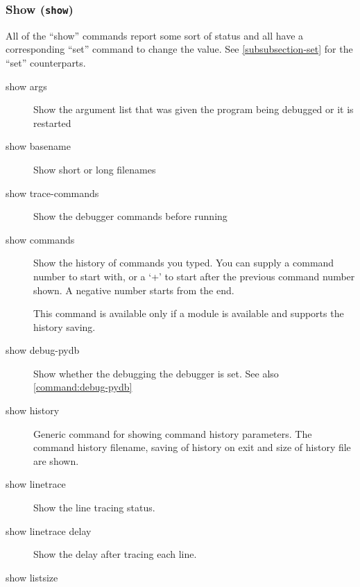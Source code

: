 \subsubsection{Show ({\tt show}) \label{subsubsection-show}}

All of the ``show'' commands report some sort of status and all have a
corresponding ``set'' command to change the value. See
\ref{subsubsection-set} for the ``set'' counterparts.

\begin{description}

\item[show args]

Show the argument list that was given the program being debugged or it is
restarted

\item[show basename]

Show short or long filenames

\item[show trace-commands]

Show the debugger commands before running

\item[show commands]

Show the history of commands you typed. You can supply a command
number to start with, or a `+' to start after the previous command
number shown.  A negative number starts from the end.

This command is available only if a
module is available and supports the history saving.

\item[show debug-pydb]

Show whether the debugging the debugger is set.
See also \ref{command:debug-pydb}

\item[show history]

Generic command for showing command history parameters. The command
history filename, saving of history on exit and size of history file
are shown.

\item[show linetrace]

Show the line tracing status.

\item[show linetrace delay]

Show the delay after tracing each line.

\item[show listsize]


\end{description}
